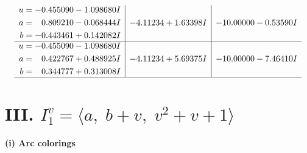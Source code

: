 \documentclass[1p]{elsarticle_modified}
\theoremstyle{definition}
\begin{document}
$$\begin{array}{c|c|c}
\begin{aligned}
u &= -0.455090 - 1.098680 I \\
a &= \phantom{-}0.809210 - 0.068444 I \\
b &= -0.443461 + 0.142082 I\end{aligned}
 & -4.11234 + 1.63398 I & -10.00000 - 0.53590 I \\ \hline\begin{aligned}
u &= -0.455090 - 1.098680 I \\
a &= \phantom{-}0.422767 + 0.488925 I \\
b &= \phantom{-}0.344777 + 0.313008 I\end{aligned}
 & -4.11234 + 5.69375 I & -10.00000 - 7.46410 I\\
 \hline 
 \end{array}$$\newpage\newpage\renewcommand{\arraystretch}{1}
\centering \section*{III. $I^v_{1}= \langle a,\;b+v,\;v^2+v+1 \rangle$}
\flushleft \textbf{(i) Arc colorings}\\
\end{document}
